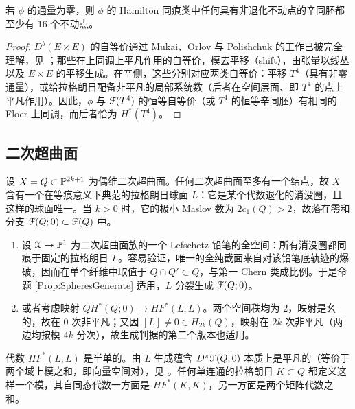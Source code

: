 
\begin{Proposition} 若 $\phi$ 的通量为零，则 $\phi$ 的 Hamilton 同痕类中任何具有非退化不动点的辛同胚都至少有 $16$ 个不动点。\end{Proposition}

\begin{proof}
$D^b(E\times E)$ 的自等价通过 Mukai、Orlov 与 Polishchuk 的工作已被完全理解，见 \cite{Orlov:abelian, Pol:weil}；那些在上同调上平凡作用的自等价，模去平移（shift），由张量以线丛以及 $E\times E$ 的平移生成。在辛侧，这些分别对应两类自等价：平移 $T^4$（具有非零通量），或给拉格朗日配备非平凡的局部系统数（后者在空间层面、即 $T^4$ 的点上平凡作用）。因此，$\phi$ 与 $\EuScript{F}(T^4)$ 的恒等自等价（或 $T^4$ 的恒等辛同胚）有相同的 Floer 上同调，而后者恰为 $H^*(T^4)$。
\end{proof}

\subsection{二次超曲面}\label{Sec:Quadrics}

设 $X=Q \subset \mathbb{P}^{2k+1}$ 为偶维二次超曲面。任何二次超曲面至多有一个结点，故 $X$ 含有一个在等痕意义下典范的拉格朗日球面 $L$：它是某个代数退化的消没圈，且这样的球面唯一。当 $k>0$ 时，它的极小 Maslov 数为 $2c_1(Q) > 2$，故落在零和分支 $\EuScript{F}(Q;0)\subset \EuScript{F}(Q)$ 中。

\begin{enumerate}
\item 设 $\EuScript{X} \rightarrow \mathbb{P}^1$ 为二次超曲面族的一个 Lefschetz 铅笔的全空间：所有消没圈都同痕于固定的拉格朗日 $L$。容易验证，唯一的全纯截面来自对该铅笔底轨迹的爆破，因而在单个纤维中取值于 $Q \cap Q' \subset Q$，与第一 Chern 类成比例。于是命题 \ref{Prop:SpheresGenerate} 适用，$L$ 分裂生成 $\EuScript{F}(Q;0)$。
\item 或者考虑映射 $QH^*(Q;0) \rightarrow HF^*(L,L)$。两个空间秩均为 $2$，映射是幺的，故在 $0$ 次非平凡；又因 $[L] \neq 0 \in H_{2k}(Q)$，映射在 $2k$ 次非平凡（两边均按模 $4k$ 分次），故生成判据的第二个版本也适用。
\end{enumerate}

代数 $HF^*(L,L)$ 是半单的。由 $L$ 生成蕴含 $D^{\pi}\EuScript{F}(Q;0)$ 本质上是平凡的（等价于两个域上模之和，即向量空间对），见 \cite{Smith:HFQuadrics}。任何单连通的拉格朗日 $K \subset Q$ 都定义这样一个模，其自同态代数一方面是 $HF^*(K,K)$，另一方面是两个矩阵代数之和。

